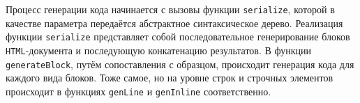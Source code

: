Процесс генерации кода начинается с вызовы функции \lstinline{serialize},
которой в качестве параметра передаётся абстрактное синтаксическое дерево.
Реализация функции \lstinline{serialize} представляет собой последовательное
генерирование блоков \lstinline{HTML}-документа и последующую конкатенацию 
результатов. В функции \lstinline{generateBlock}, путём сопоставления с 
образцом, происходит генерация кода для каждого вида блоков. Тоже самое, но 
на уровне строк и строчных элементов происходит в функциях \lstinline{genLine}
и \lstinline{genInline} соответственно.   

\newpage

\printbibliography[heading=bibintoc%
]


